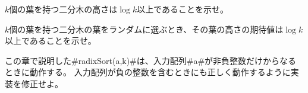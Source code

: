 \begin{exc}
$k$個の葉を持つ二分木の高さは$\log k$以上であることを示せ。
\end{exc}

\begin{exc}
$k$個の葉を持つ二分木の葉をランダムに選ぶとき、その葉の高さの期待値は$\log k$以上であることを示せ。
\end{exc}

%

\begin{exc}
この章で説明した#radixSort(a,k)#は、入力配列#a#が非負整数だけからなるときに動作する。
入力配列が負の整数を含むときにも正しく動作するように実装を修正せよ。
\end{exc}

